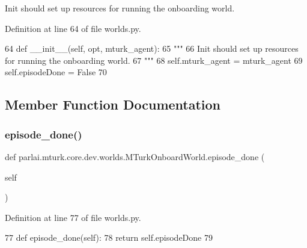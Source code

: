 \begin{DoxyVerb}Init should set up resources for running the onboarding world.
\end{DoxyVerb}
 

Definition at line 64 of file worlds.\+py.


\begin{DoxyCode}
64     \textcolor{keyword}{def }\_\_init\_\_(self, opt, mturk\_agent):
65         \textcolor{stringliteral}{"""}
66 \textcolor{stringliteral}{        Init should set up resources for running the onboarding world.}
67 \textcolor{stringliteral}{        """}
68         self.mturk\_agent = mturk\_agent
69         self.episodeDone = \textcolor{keyword}{False}
70 
\end{DoxyCode}


\subsection{Member Function Documentation}
\mbox{\label{classparlai_1_1mturk_1_1core_1_1dev_1_1worlds_1_1MTurkOnboardWorld_ab1ff8d34d5ed9f7ecd01b82849767c25}} 
\subsubsection{\texorpdfstring{episode\+\_\+done()}{episode\_done()}}
{\footnotesize\ttfamily def parlai.\+mturk.\+core.\+dev.\+worlds.\+M\+Turk\+Onboard\+World.\+episode\+\_\+done (\begin{DoxyParamCaption}\item[{}]{self }\end{DoxyParamCaption})}



Definition at line 77 of file worlds.\+py.


\begin{DoxyCode}
77     \textcolor{keyword}{def }episode\_done(self):
78         \textcolor{keywordflow}{return} self.episodeDone
79 
\end{DoxyCode}
\mbox{\label{classparlai_1_1mturk_1_1core_1_1dev_1_1worlds_1_1MTurkOnboardWorld_a95101a5140c8b06875315f60b7155a5d}} 

